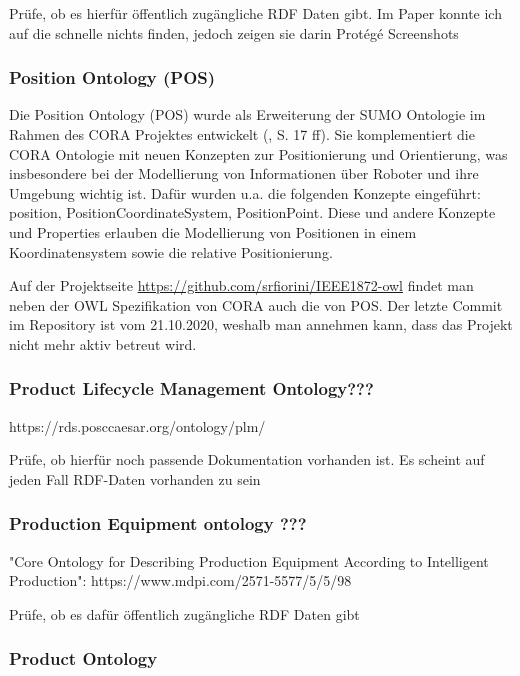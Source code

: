 \documentclass{article}
\begin{document}
Prüfe, ob es hierfür öffentlich zugängliche RDF Daten gibt. Im Paper konnte ich auf die schnelle nichts finden, jedoch zeigen sie darin Protégé Screenshots

\subsubsection{Position Ontology (POS)}


Die Position Ontology (POS) wurde als Erweiterung der SUMO Ontologie im Rahmen des CORA Projektes entwickelt (\cite{fiorini2015extensions}, S. 17 ff).
Sie komplementiert die CORA Ontologie mit neuen Konzepten zur Positionierung und Orientierung, was insbesondere bei der Modellierung von Informationen über Roboter und ihre Umgebung wichtig ist.
Dafür wurden u.a. die folgenden Konzepte eingeführt: position, PositionCoordinateSystem, PositionPoint.
Diese und andere Konzepte und Properties erlauben die Modellierung von Positionen in einem Koordinatensystem sowie die relative Positionierung.

Auf der Projektseite \url{https://github.com/srfiorini/IEEE1872-owl} findet man neben der OWL Spezifikation von CORA auch die von POS. Der letzte Commit im Repository ist vom 21.10.2020, weshalb man annehmen kann, dass das Projekt nicht mehr aktiv betreut wird.

\subsubsection{Product Lifecycle Management Ontology???}

https://rds.posccaesar.org/ontology/plm/

Prüfe, ob hierfür noch passende Dokumentation vorhanden ist. Es scheint auf jeden Fall RDF-Daten vorhanden zu sein

\subsubsection{Production Equipment ontology ???}

"Core Ontology for Describing Production Equipment According to Intelligent Production":
https://www.mdpi.com/2571-5577/5/5/98

Prüfe, ob es dafür öffentlich zugängliche RDF Daten gibt

\subsubsection{Product Ontology}
\end{document}
